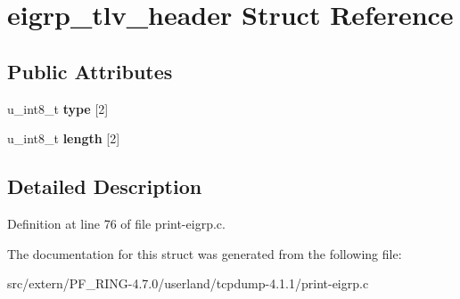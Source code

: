 \hypertarget{structeigrp__tlv__header}{
\section{eigrp\_\-tlv\_\-header Struct Reference}
\label{structeigrp__tlv__header}
}
\subsection*{Public Attributes}
\begin{DoxyCompactItemize}
\item 
\hypertarget{structeigrp__tlv__header_a472ac06d751d76f28eb24a168ab78879}{
u\_\-int8\_\-t {\bfseries type} \mbox{[}2\mbox{]}}
\label{structeigrp__tlv__header_a472ac06d751d76f28eb24a168ab78879}

\item 
\hypertarget{structeigrp__tlv__header_a5431ea6dff3021bf9a15f8c8fabdb85c}{
u\_\-int8\_\-t {\bfseries length} \mbox{[}2\mbox{]}}
\label{structeigrp__tlv__header_a5431ea6dff3021bf9a15f8c8fabdb85c}

\end{DoxyCompactItemize}


\subsection{Detailed Description}


Definition at line 76 of file print-\/eigrp.c.



The documentation for this struct was generated from the following file:\begin{DoxyCompactItemize}
\item 
src/extern/PF\_\-RING-\/4.7.0/userland/tcpdump-\/4.1.1/print-\/eigrp.c\end{DoxyCompactItemize}
